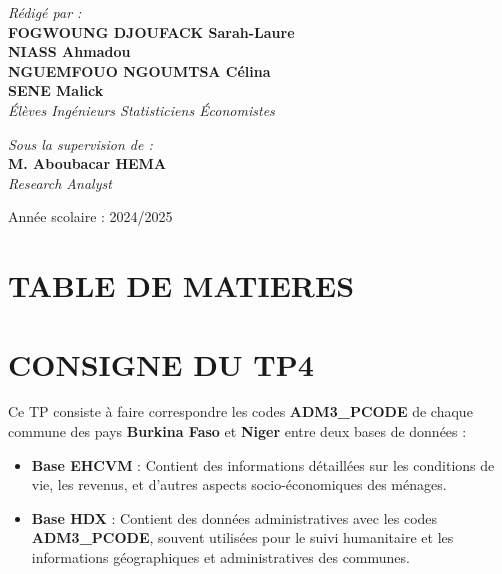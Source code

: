 \documentclass[
]{article}
\providecommand{\tightlist}{%
  \setlength{\itemsep}{0pt}\setlength{\parskip}{0pt}}
\begin{document}
\begin{titlepage}
\begin{center}
        \begin{minipage}{0.5\textwidth}
    \begin{flushleft} \large
        \emph{\textsf{Rédigé par :}}\\
        \textbf{FOGWOUNG DJOUFACK Sarah-Laure}\\
        \textbf{NIASS Ahmadou}\\
        \textbf{NGUEMFOUO NGOUMTSA Célina}\\
        \textbf{SENE Malick}\\
        \textit{Élèves Ingénieurs Statisticiens Économistes}
    \end{flushleft}
\end{minipage}
        \hfill
        \begin{minipage}{0.4\textwidth}
            \begin{flushright} \large
                \emph{\textsf{Sous la supervision de :}} \\
                \textbf{M. Aboubacar HEMA}\\
                \textit{Research Analyst }
            \end{flushright}
        \end{minipage}

        \vfill

        {\large \textsf{Année scolaire : 2024/2025}}\\[0.5cm]
        
    \end{center}
\end{titlepage}

\section{TABLE DE MATIERES}\label{table-de-matieres}

\tableofcontents

\newpage

\section{CONSIGNE DU TP4}\label{consigne-du-tp4}

Ce TP consiste à faire correspondre les codes \textbf{ADM3\_PCODE} de
chaque commune des pays \textbf{Burkina Faso} et \textbf{Niger} entre
deux bases de données :

\begin{itemize}
\tightlist
\item
  \textbf{Base EHCVM} : Contient des informations détaillées sur les
  conditions de vie, les revenus, et d'autres aspects socio-économiques
  des ménages.
\item
  \textbf{Base HDX} : Contient des données administratives avec les
  codes \textbf{ADM3\_PCODE}, souvent utilisées pour le suivi
  humanitaire et les informations géographiques et administratives des
  communes.
\end{itemize}
\end{document}
